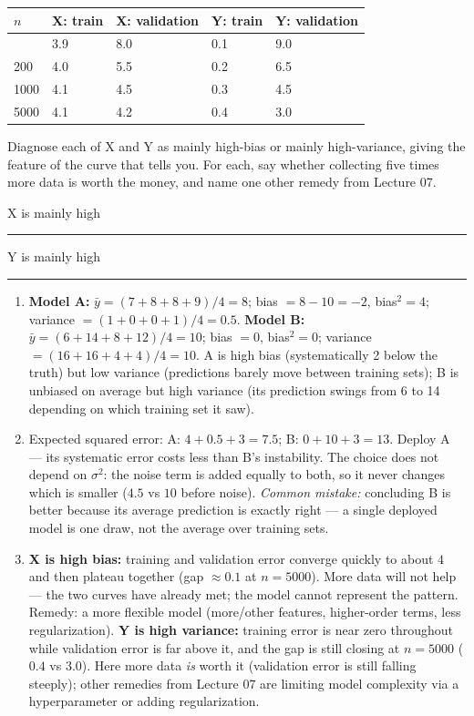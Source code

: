 \documentclass[
  11pt,
]{article}
\newcounter{none} %
\newcommand{\answerspace}[1]{\par\vspace*{#1}}  %
\newcommand{\blank}[1][1.2in]{\rule{#1}{0.4pt}}
\begin{document}
{\def\LTcaptype{none} %
\begin{longtable}[]{@{}lllll@{}}
\toprule\noalign{}
\(n\) & X: train & X: validation & Y: train & Y: validation \\
\midrule\noalign{}
\endhead
\bottomrule\noalign{}
\endlastfoot
50 & 3.9 & 8.0 & 0.1 & 9.0 \\
200 & 4.0 & 5.5 & 0.2 & 6.5 \\
1000 & 4.1 & 4.5 & 0.3 & 4.5 \\
5000 & 4.1 & 4.2 & 0.4 & 3.0 \\
\end{longtable}
}

Diagnose each of X and Y as mainly high-bias or mainly high-variance,
giving the feature of the curve that tells you. For each, say whether
collecting five times more data is worth the money, and name one other
remedy from Lecture 07.

X is mainly high \blank[1in]\quad Y is mainly high \blank[1in]

\answerspace{2.5in}

\begin{solutionbox}

\begin{enumerate}
\def\labelenumi{(\alph{enumi})}
\item
  \textbf{Model A:} \(\bar y = (7+8+8+9)/4 = 8\); bias \(= 8-10 = -2\),
  bias\(^2 = 4\); variance \(= (1+0+0+1)/4 = 0.5\). \textbf{Model B:}
  \(\bar y = (6+14+8+12)/4 = 10\); bias \(= 0\), bias\(^2 = 0\);
  variance \(= (16+16+4+4)/4 = 10\). A is high bias (systematically 2
  below the truth) but low variance (predictions barely move between
  training sets); B is unbiased on average but high variance (its
  prediction swings from 6 to 14 depending on which training set it
  saw).
\item
  Expected squared error: A: \(4 + 0.5 + 3 = 7.5\); B:
  \(0 + 10 + 3 = 13\). Deploy A --- its systematic error costs less than
  B's instability. The choice does not depend on \(\sigma^2\): the noise
  term is added equally to both, so it never changes which is smaller
  (\(4.5\) vs \(10\) before noise). \emph{Common mistake:} concluding B
  is better because its average prediction is exactly right --- a single
  deployed model is one draw, not the average over training sets.
\item
  \textbf{X is high bias:} training and validation error converge
  quickly to about \(4\) and then plateau together (gap \(\approx 0.1\)
  at \(n = 5000\)). More data will not help --- the two curves have
  already met; the model cannot represent the pattern. Remedy: a more
  flexible model (more/other features, higher-order terms, less
  regularization). \textbf{Y is high variance:} training error is near
  zero throughout while validation error is far above it, and the gap is
  still closing at \(n = 5000\) (\(0.4\) vs \(3.0\)). Here more data
  \emph{is} worth it (validation error is still falling steeply); other
  remedies from Lecture 07 are limiting model complexity via a
  hyperparameter or adding regularization.
\end{enumerate}

\end{solutionbox}
\end{document}
